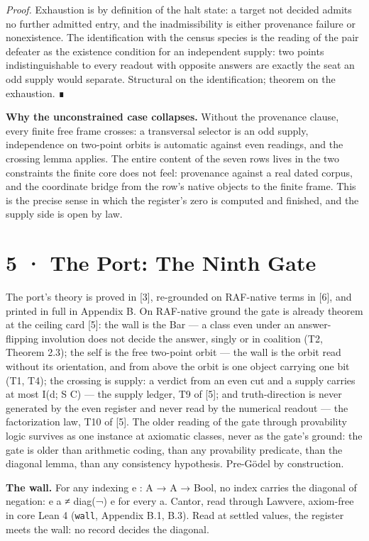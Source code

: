 \documentclass[10pt,twocolumn]{article}
\begin{document}
\emph{Proof.} Exhaustion is by definition of the halt state: a target
not decided admits no further admitted entry, and the inadmissibility is
either provenance failure or nonexistence. The identification with the
census species is the reading of the pair defeater as the existence
condition for an independent supply: two points indistinguishable to
every readout with opposite answers are exactly the seat an odd supply
would separate. Structural on the identification; theorem on the
exhaustion. ∎

\textbf{Why the unconstrained case collapses.} Without the provenance
clause, every finite free frame crosses: a transversal selector is an
odd supply, independence on two-point orbits is automatic against even
readings, and the crossing lemma applies. The entire content of the
seven rows lives in the two constraints the finite core does not feel:
provenance against a real dated corpus, and the coordinate bridge from
the row's native objects to the finite frame. This is the precise sense
in which the register's zero is computed and finished, and the supply
side is open by law.

\section{5 · The Port: The Ninth Gate}\label{the-port-the-ninth-gate}

The port's theory is proved in {[}3{]}, re-grounded on RAF-native terms
in {[}6{]}, and printed in full in Appendix B. On RAF-native ground the
gate is already theorem at the ceiling card {[}5{]}: the wall is the Bar
--- a class even under an answer-flipping involution does not decide the
answer, singly or in coalition (T2, Theorem 2.3); the self is the free
two-point orbit --- the wall is the orbit read without its orientation,
and from above the orbit is one object carrying one bit (T1, T4); the
crossing is supply: a verdict from an even cut and a supply carries at
most I(d; S \textbar{} C) --- the supply ledger, T9 of {[}5{]}; and
truth-direction is never generated by the even register and never read
by the numerical readout --- the factorization law, T10 of {[}5{]}. The
older reading of the gate through provability logic survives as one
instance at axiomatic classes, never as the gate's ground: the gate is
older than arithmetic coding, than any provability predicate, than the
diagonal lemma, than any consistency hypothesis. Pre-Gödel by
construction.

\textbf{The wall.} For any indexing e : A → A → Bool, no index carries
the diagonal of negation: e a ≠ diag(¬) e for every a. Cantor, read
through Lawvere, axiom-free in core Lean 4 (\texttt{wall}, Appendix B.1,
B.3). Read at settled values, the register meets the wall: no record
decides the diagonal.
\end{document}
